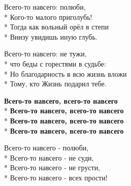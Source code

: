 \medskip

\begin{minipage}{\linewidth}
Всего-то навсего: полюби,\\*
Кого-то малого приголубь!\\*
Тогда как вольный орёл в степи\\*
Внизу увидишь иную глубь.\\
\end{minipage}\par\medskip\nobreak

\medskip

\begin{minipage}{\linewidth}
Всего-то навсего: не тужи,\\*
что беды с горестями в судьбе:\\*
Но благодарность в всю жизнь вложи\\*
Тому, кто Жизнь подарил тебе.\\
\end{minipage}\par\medskip\nobreak

\medskip

\begin{minipage}{\linewidth}
\hspace*{1.5em}\textbf{Всего-то навсего, всего-то навсего}\\*
\hspace*{1.5em}\textbf{Всего-то навсего, всего-то навсего}\\*
\hspace*{1.5em}\textbf{Всего-то навсего, всего-то навсего}\\*
\hspace*{1.5em}\textbf{Всего-то навсего, всего-то навсего}\\
\end{minipage}\par\medskip\nobreak

\medskip

\begin{minipage}{\linewidth}
\hspace*{1.5em}Всего-то навсего - полюби,\\*
\hspace*{1.5em}Всего-то навсего - не суди,\\*
\hspace*{1.5em}Всего-то навсего - не грусти,\\*
\hspace*{1.5em}Всего-то навсего - всех прости!\\
\end{minipage}

